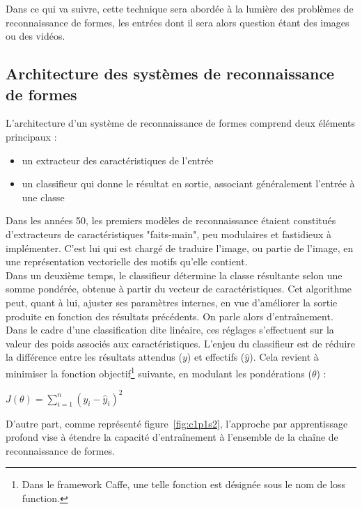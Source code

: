 \documentclass[a4paper,10pt]{report}
\begin{document}
Dans ce qui va suivre, cette technique sera abordée à la lumière des problèmes de reconnaissance de formes, les entrées dont il sera alors question étant des images ou des vidéos.

\subsection{Architecture des systèmes de reconnaissance de formes}

L'architecture d'un système de reconnaissance de formes comprend deux éléments principaux :

\begin{itemize}
  \item un extracteur des caractéristiques de l'entrée
  \item un classifieur qui donne le résultat en sortie, associant généralement l'entrée à une classe
\end{itemize}


Dans les années 50, les premiers modèles de reconnaissance étaient constitués d'extracteurs de caractéristiques "faits-main", peu modulaires et fastidieux à implémenter\cite{Bib_LeCun}.
C'est lui qui est chargé de traduire l'image, ou partie de l'image, en une représentation vectorielle des motifs qu'elle contient. 
\\

Dans un deuxième temps, le classifieur détermine la classe résultante selon une somme pondérée, obtenue à partir du vecteur de caractéristiques.
Cet algorithme peut, quant à lui, ajuster ses paramètres internes, en vue d'améliorer la sortie produite en fonction des résultats précédents. On parle alors d'entraînement.
Dans le cadre d'une classification dite linéaire, ces réglages s'effectuent sur la valeur des poids associés aux caractéristiques.
L'enjeu du classifieur est de réduire la différence entre les résultats attendus ($y$) et effectifs ($\hat{y}$).
Cela revient à minimiser la fonction objectif\footnote{Dans le framework Caffe, une telle fonction est désignée sous le nom de loss function.} suivante, en modulant les pondérations ($\theta$) :

\begin{center} $ J({\theta}) =  \sum\limits_{i=1}^{n} (y_{i} - \hat{y}_{i})^2 $ \end{center} 

D'autre part, comme représenté figure~\ref{fig:c1p1s2}, l'approche par apprentissage profond vise à étendre la capacité d'entraînement à l'ensemble de la chaîne de reconnaissance de formes.
\end{document}
